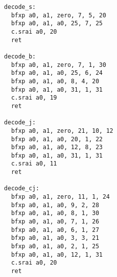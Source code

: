 \begin{multicols}{2}
\begin{verbatim}
  decode_s:
    bfxp a0, a1, zero, 7, 5, 20
    bfxp a0, a1, a0, 25, 7, 25
    c.srai a0, 20
    ret

  decode_b:
    bfxp a0, a1, zero, 7, 1, 30
    bfxp a0, a1, a0, 25, 6, 24
    bfxp a0, a1, a0, 8, 4, 20
    bfxp a0, a1, a0, 31, 1, 31
    c.srai a0, 19
    ret

  decode_j:
    bfxp a0, a1, zero, 21, 10, 12
    bfxp a0, a1, a0, 20, 1, 22
    bfxp a0, a1, a0, 12, 8, 23
    bfxp a0, a1, a0, 31, 1, 31
    c.srai a0, 11
    ret

  decode_cj:
    bfxp a0, a1, zero, 11, 1, 24
    bfxp a0, a1, a0, 9, 2, 28
    bfxp a0, a1, a0, 8, 1, 30
    bfxp a0, a1, a0, 7, 1, 26
    bfxp a0, a1, a0, 6, 1, 27
    bfxp a0, a1, a0, 3, 3, 21
    bfxp a0, a1, a0, 2, 1, 25
    bfxp a0, a1, a0, 12, 1, 31
    c.srai a0, 20
    ret
\end{verbatim}
\end{multicols}
